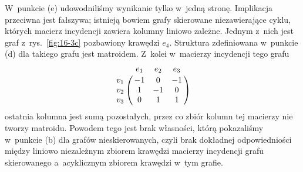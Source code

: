 \subproblem %
W~punkcie (e) udowodniliśmy wynikanie tylko w~jedną stronę.
Implikacja przeciwna jest fałszywa; istnieją bowiem grafy skierowane niezawierające cyklu, których macierz incydencji zawiera kolumny liniowo zależne.
Jednym z~nich jest graf z~rys.\ \ref{fig:16-3c} pozbawiony krawędzi $e_4$.
Struktura zdefiniowana w~punkcie (d) dla takiego grafu jest matroidem.
Z~kolei w~macierzy incydencji tego grafu
\[
	\bordermatrix{~ & e_1 & e_2 & e_3 \cr
		v_1 & -1 & 0 & -1 \cr
		v_2 & 1 & -1 & 0 \cr
		v_3 & 0 & 1 & 1}
\]
ostatnia kolumna jest sumą pozostałych, przez co zbiór kolumn tej macierzy nie tworzy matroidu.
Powodem tego jest brak własności, którą pokazaliśmy w~punkcie (b) dla grafów nieskierowanych, czyli brak dokładnej odpowiedniości między liniowo niezależnym zbiorem krawędzi macierzy incydencji grafu skierowanego a~acyklicznym zbiorem krawędzi w~tym grafie.
